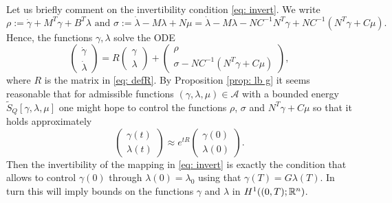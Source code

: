 \documentclass[11pt]{article}
\begin{document}
\begin{remark}
    Let us briefly comment on the invertibility condition \eqref{eq: invert}. We write 
    \[
    \rho := \dot{\gamma} + M^T \gamma + B^T \lambda \text{ and } \sigma := \dot{\lambda} - M \lambda + N\mu = \dot{\lambda} - M \lambda - N C^{-1} N^T\gamma + NC^{-1} ( N^T \gamma + C \mu).
    \]
    Hence, the functions $\gamma, \lambda$ solve the ODE
    \[
    \begin{pmatrix}
        \dot{\gamma} \\ \dot{\lambda}
    \end{pmatrix} = R \begin{pmatrix}
        \gamma \\ \lambda
    \end{pmatrix} + \begin{pmatrix}
        \rho \\ \sigma - NC^{-1}(N^T \gamma + C \mu)
    \end{pmatrix},
    \]
    where $R$ is the matrix in \eqref{eq: defR}. 
    By Proposition \ref{prop: lb g} it seems reasonable that for admissible functions $(\gamma,\lambda,\mu) \in \mathcal{A}$ with a bounded energy $\tilde{S}_Q[\gamma,\lambda,\mu]$ one might hope to control the functions $\rho$, $\sigma$ and $N^T \gamma + C \mu$ so that it holds approximately
    \[
    \begin{pmatrix}
        \gamma(t) \\ \lambda(t)
    \end{pmatrix} \approx e^{tR} \begin{pmatrix}
        \gamma(0) \\ \lambda(0)
    \end{pmatrix}.
    \]
    Then the invertibility of the mapping in \eqref{eq: invert} is exactly the condition that allows to control $\gamma(0)$ through $\lambda(0) = \lambda_0$ using that $\gamma(T) = G \lambda(T)$. In turn this will imply bounds on the functions $\gamma$ and $\lambda$ in $H^1((0,T);\mathbb R^n)$.
\end{remark}
\end{document}
